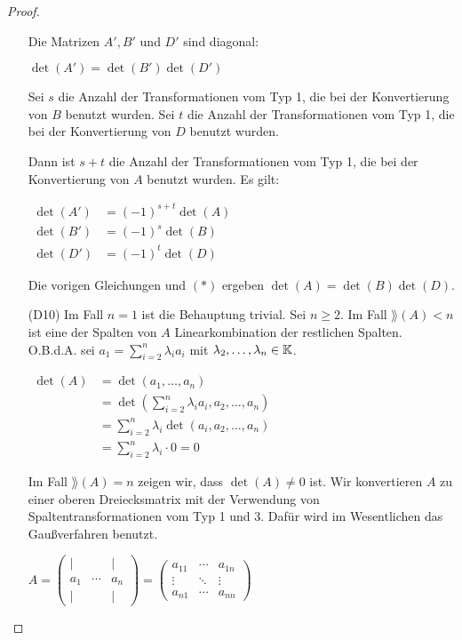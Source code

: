 \begin{proof}
\begin{itemize}
			Die Matrizen $ A', B' $ und $ D' $ sind diagonal:
			
			$ \det(A') = \det(B')\det(D') $
			
			Sei $ s $ die Anzahl der Transformationen vom Typ 1, die bei der Konvertierung von $ B $ benutzt wurden. Sei $ t $ die Anzahl der Transformationen vom Typ 1, die bei der Konvertierung von $ D $ benutzt wurden.
			
			Dann ist $ s+t $ die Anzahl der Transformationen vom Typ 1, die bei der Konvertierung von $ A $ benutzt wurden. Es gilt:
			
			$ \begin{aligned}
				\det(A') &= (-1)^{s+t} \det(A) \\
				\det(B') &= (-1)^s \det(B) \\
				\det(D') &= (-1)^t \det(D)
			\end{aligned} $
			
			Die vorigen Gleichungen und $ (\ast) $ ergeben $ \det(A) = \det(B)\det(D) $.
		\item[\normalfont(D10)]
			Im Fall $ n=1 $ ist die Behauptung trivial. Sei $ n \geq 2 $. Im Fall $ \rang(A) < n $ ist eine der Spalten von $ A $ Linearkombination der restlichen Spalten. O.B.d.A. sei $ a_1 = \sum_{i=2}^n \lambda_i a_i $ mit $ \lambda_2, \ldots, \lambda_n \in \mathbb K $.
			
			$ \begin{aligned}
				\det(A) &= \det(a_1, \ldots, a_n) \\
				&= \det\left(\sum_{i=2}^n \lambda_i a_i, a_2, \ldots, a_n\right) \\
				&= \sum_{i=2}^n \lambda_i \det(a_i, a_2, \ldots, a_n) \\
				&= \sum_{i=2}^n \lambda_i \cdot 0 = 0
			\end{aligned} $
			
			Im Fall $ \rang(A) = n $ zeigen wir, dass $ \det(A) \neq 0 $ ist. Wir konvertieren $ A $ zu einer oberen Dreiecksmatrix mit der Verwendung von Spaltentransformationen vom Typ 1 und 3. Dafür wird im Wesentlichen das Gaußverfahren benutzt.
			
			$ A = \begin{pmatrix}
				| && | \\
				a_1 & \cdots & a_n \\
				| && |
			\end{pmatrix}
			= \begin{pmatrix}
				a_{11} & \cdots & a_{1n} \\
				\vdots & \ddots & \vdots \\
				a_{n1} & \cdots & a_{nn}
			\end{pmatrix} $
			

\end{itemize}
\end{proof}
